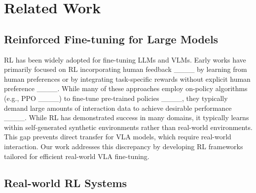 \section{Related Work}
\subsection{Reinforced Fine-tuning for Large Models}

RL has been widely adopted for fine-tuning LLMs and VLMs. Early works have primarily focused on RL incorporating human feedback ____ by learning from human preferences or by integrating task-specific rewards without explicit human preference ____. While many of these approaches employ on-policy algorithms (e.g., PPO ____) to fine-tune pre-trained policies ____, they typically demand large amounts of interaction data to achieve desirable performance ____. While RL has demonstrated success in many domains, it typically learns within self-generated synthetic environments rather than real-world environments. This gap prevents direct transfer for VLA models, which require real-world interaction. Our work addresses this discrepancy by developing RL frameworks tailored for efficient real-world VLA fine-tuning.

\subsection{Real-world RL Systems}

